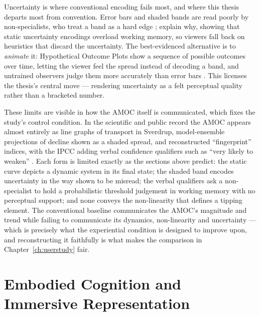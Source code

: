 
 
Uncertainty is where conventional encoding fails most, and where this thesis departs most from convention. Error bars and shaded bands are read poorly by non-specialists, who treat a band as a hard edge \citep{spiegelhalter2017}; \citet{padilla2018} explain why, showing that static uncertainty encodings overload working memory, so viewers fall back on heuristics that discard the uncertainty. The best-evidenced alternative is to \emph{animate} it: Hypothetical Outcome Plots show a sequence of possible outcomes over time, letting the viewer feel the spread instead of decoding a band, and untrained observers judge them more accurately than error bars \citep{hullman2015hops, kale2019hops}. This licenses the thesis's central move --- rendering uncertainty as a felt perceptual quality rather than a bracketed number.
 
These limits are visible in how the AMOC itself is communicated, which fixes the study's control condition. In the scientific and public record the AMOC appears almost entirely as line graphs of transport in Sverdrup, model-ensemble projections of decline shown as a shaded spread, and reconstructed ``fingerprint'' indices, with the IPCC adding verbal confidence qualifiers such as ``very likely to weaken'' \citep{caesar2018, ipcc2021}. Each form is limited exactly as the sections above predict: the static curve depicts a dynamic system in its final state; the shaded band encodes uncertainty in the way shown to be misread; the verbal qualifiers ask a non-specialist to hold a probabilistic threshold judgement in working memory with no perceptual support; and none conveys the non-linearity that defines a tipping element. The conventional baseline communicates the AMOC's magnitude and trend while failing to communicate its dynamics, non-linearity and uncertainty --- which is precisely what the experiential condition is designed to improve upon, and reconstructing it faithfully is what makes the comparison in Chapter~\ref{ch:userstudy} fair.

\section{Embodied Cognition and Immersive Representation}
\label{sec:embodied-viz}
 
